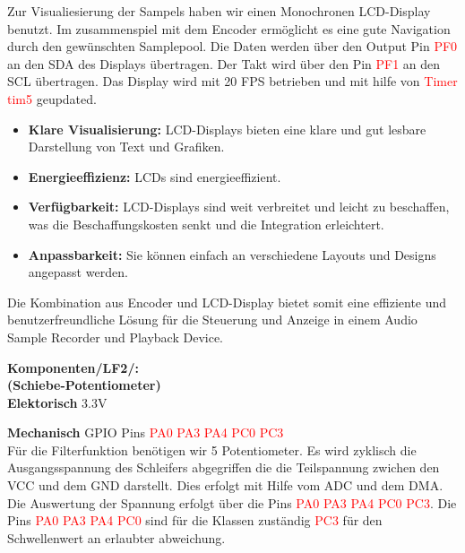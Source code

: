 Zur Visualiesierung der Sampels haben wir einen Monochronen LCD-Display benutzt. Im zusammenspiel mit dem Encoder ermöglicht es eine gute Navigation durch den gewünschten Samplepool. Die Daten werden über den Output Pin  \textcolor{red}{PF0} an den SDA des Displays übertragen. Der Takt wird über den Pin  \textcolor{red}{PF1} an den SCL übertragen. Das Display wird mit 20 FPS betrieben und mit hilfe von \textcolor{red}{Timer tim5} geupdated.

\begin{itemize}
	\item \textbf{Klare Visualisierung:} LCD-Displays bieten eine klare und gut lesbare Darstellung von Text und Grafiken.
	
	\item \textbf{Energieeffizienz:} LCDs sind energieeffizient.
	
	\item \textbf{Verfügbarkeit:} LCD-Displays sind weit verbreitet und leicht zu beschaffen, was die Beschaffungskosten senkt und die Integration erleichtert.
	
	\item \textbf{Anpassbarkeit:} Sie können einfach an verschiedene Layouts und Designs angepasst werden.
\end{itemize}


Die Kombination aus Encoder und LCD-Display bietet somit eine effiziente und benutzerfreundliche Lösung für die Steuerung und Anzeige in einem Audio Sample Recorder und Playback Device.

\newpage
\textbf{Komponenten/LF2/:}\\

\textbf{(Schiebe-Potentiometer)}\\

\textbf{Elektorisch} 3.3V

\textbf{Mechanisch} GPIO Pins  \textcolor{red}{PA0 PA3 PA4 PC0 PC3} \\

Für die Filterfunktion benötigen wir 5 Potentiometer. Es wird zyklisch die Ausgangsspannung des Schleifers abgegriffen die die Teilspannung zwichen den VCC und dem GND darstellt. Dies erfolgt mit Hilfe vom ADC und dem DMA. Die Auswertung der Spannung erfolgt über die Pins  \textcolor{red}{PA0 PA3 PA4 PC0 PC3}. Die Pins  \textcolor{red}{PA0 PA3 PA4 PC0} sind für die Klassen zuständig  \textcolor{red}{PC3} für den Schwellenwert an erlaubter abweichung.

